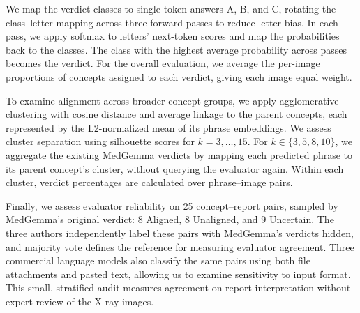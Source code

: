 We map the verdict classes to single-token answers A, B, and C, rotating the class–letter mapping across three forward passes to reduce letter bias. In each pass, we apply softmax to letters' next-token scores and map the probabilities back to the classes. The class with the highest average probability across passes becomes the verdict. For the overall evaluation, we average the per-image proportions of concepts assigned to each verdict, giving each image equal weight.

To examine alignment across broader concept groups, we apply agglomerative clustering with cosine distance and average linkage to the parent concepts, each represented by the L2-normalized mean of its phrase embeddings. We assess cluster separation using silhouette scores for \(k=3,\ldots,15\). For \(k\in\{3,5,8,10\}\), we aggregate the existing MedGemma verdicts by mapping each predicted phrase to its parent concept’s cluster, without querying the evaluator again. Within each cluster, verdict percentages are calculated over phrase–image pairs.

Finally, we assess evaluator reliability on 25 concept--report pairs, sampled by MedGemma's original verdict: 8 Aligned, 8 Unaligned, and 9 Uncertain. The three authors independently label these pairs with MedGemma's verdicts hidden, and majority vote defines the reference for measuring evaluator agreement. Three commercial language models also classify the same pairs using both file attachments and pasted text, allowing us to examine sensitivity to input format. This small, stratified audit measures agreement on report interpretation without expert review of the X-ray images.
